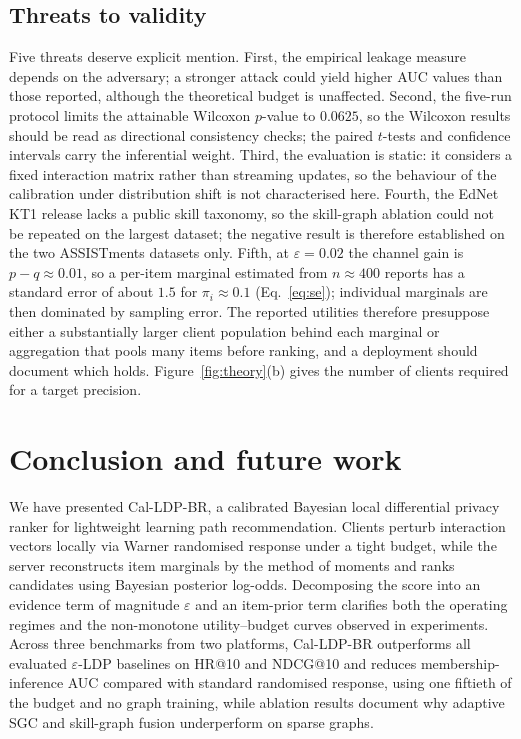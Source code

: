 \documentclass[pdflatex,sn-basic,Numbered]{sn-jnl}
\theoremstyle{plain}
\theoremstyle{remark}
\theoremstyle{definition}
\newcommand{\eps}{\varepsilon}
\begin{document}
\subsection{Threats to validity}

Five threats deserve explicit mention. First, the empirical leakage measure depends on the adversary; a stronger attack could yield higher AUC values than those reported, although the theoretical budget is unaffected. Second, the five-run protocol limits the attainable Wilcoxon $p$-value to $0.0625$, so the Wilcoxon results should be read as directional consistency checks; the paired $t$-tests and confidence intervals carry the inferential weight. Third, the evaluation is static: it considers a fixed interaction matrix rather than streaming updates, so the behaviour of the calibration under distribution shift is not characterised here. Fourth, the EdNet KT1 release lacks a public skill taxonomy, so the skill-graph ablation could not be repeated on the largest dataset; the negative result is therefore established on the two ASSISTments datasets only. Fifth, at $\eps=0.02$ the channel gain is $p-q\approx0.01$, so a per-item marginal estimated from $n\approx400$ reports has a standard error of about $1.5$ for $\pi_i\approx0.1$ (Eq.~\eqref{eq:se}); individual marginals are then dominated by sampling error. The reported utilities therefore presuppose either a substantially larger client population behind each marginal or aggregation that pools many items before ranking, and a deployment should document which holds. Figure~\ref{fig:theory}(b) gives the number of clients required for a target precision.

\section{Conclusion and future work}\label{sec:conclusion}

We have presented Cal-LDP-BR, a calibrated Bayesian local differential privacy ranker for lightweight learning path recommendation. Clients perturb interaction vectors locally via Warner randomised response under a tight budget, while the server reconstructs item marginals by the method of moments and ranks candidates using Bayesian posterior log-odds. Decomposing the score into an evidence term of magnitude $\eps$ and an item-prior term clarifies both the operating regimes and the non-monotone utility--budget curves observed in experiments. Across three benchmarks from two platforms, Cal-LDP-BR outperforms all evaluated $\eps$-LDP baselines on HR@10 and NDCG@10 and reduces membership-inference AUC compared with standard randomised response, using one fiftieth of the budget and no graph training, while ablation results document why adaptive SGC and skill-graph fusion underperform on sparse graphs.
\end{document}
